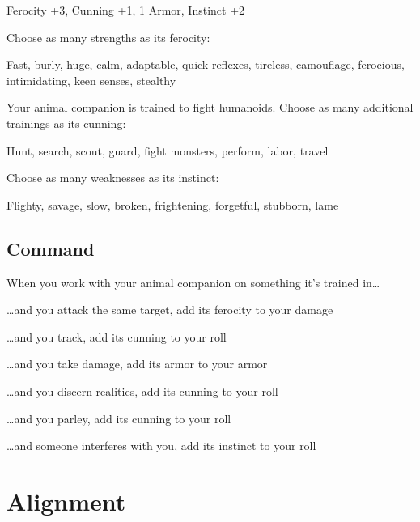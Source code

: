  
\item Ferocity +3, Cunning +1, 1 Armor, Instinct +2


\stopitemize
 

Choose as many strengths as its ferocity:

 
\startExample
Fast, burly, huge, calm, adaptable, quick reflexes, tireless, camouflage, ferocious, intimidating, keen senses, stealthy
\stopExample
 

Your animal companion is trained to fight humanoids. Choose as many additional trainings as its cunning:

 
\startExample
Hunt, search, scout, guard, fight monsters, perform, labor, travel
\stopExample
 

Choose as many weaknesses as its instinct:

 
\startExample
Flighty, savage, slow, broken, frightening, forgetful, stubborn, lame
\stopExample
 
\subsection{Command}   
 

When you work with your animal companion on something it's trained in…

 
\startitemize[1,packed]

\item …and you attack the same target, add its ferocity to your damage

 
\item …and you track, add its cunning to your roll

 
\item …and you take damage, add its armor to your armor

 
\item …and you discern realities, add its cunning to your roll

 
\item …and you parley, add its cunning to your roll

 
\item …and someone interferes with you, add its instinct to your roll


\stopitemize




 
\section{Alignment}   
 
